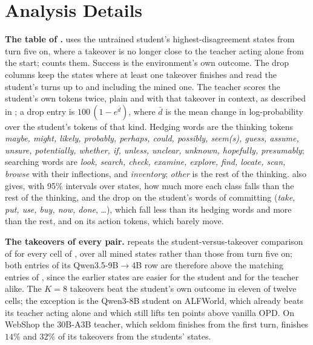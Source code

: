 \section{Analysis Details}
\label{app:analysis}
\label{app:delay}



\textbf{The table of .}  uses the untrained student's highest-disagreement states from turn five on, where a takeover is no longer close to the teacher acting alone from the start;  counts them. Success is the environment's own outcome. The drop columns keep the states where at least one takeover finishes and read the student's turns up to and including the mined one. The teacher scores the student's own tokens twice, plain and with that takeover in context, as described in ; a drop entry is $100\,(1-e^{\bar d})$, where $\bar d$ is the mean change in log-probability over the student's tokens of that kind. Hedging words are the thinking tokens \emph{maybe, might, likely, probably, perhaps, could, possibly, seem(s), guess, assume, unsure, potentially, whether, if, unless, unclear, unknown, hopefully, presumably}; searching words are \emph{look, search, check, examine, explore, find, locate, scan, browse} with their inflections, and \emph{inventory}; \emph{other} is the rest of the thinking.  also gives, with 95\% intervals over states, how much more each class falls than the rest of the thinking, and the drop on the student's words of committing (\emph{take, put, use, buy, now, done}, \ldots), which fall less than its hedging words and more than the rest, and on its action tokens, which barely move.



\textbf{The takeovers of every pair.}  repeats the student-versus-takeover comparison of  for every cell of , over all mined states rather than those from turn five on; both entries of its Qwen3.5-9B$\to$4B row are therefore above the matching entries of , since the earlier states are easier for the student and for the teacher alike. The $K{=}8$ takeovers beat the student's own outcome in eleven of twelve cells; the exception is the Qwen3-8B student on ALFWorld, which already beats its teacher acting alone and which \method{} still lifts ten points above vanilla OPD. On WebShop the 30B-A3B teacher, which seldom finishes from the first turn, finishes $14\%$ and $32\%$ of its takeovers from the students' states.

